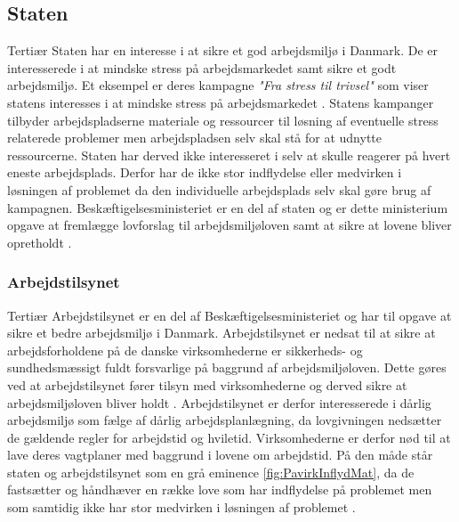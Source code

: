 \subsection{Staten} Tertiær
Staten har en interesse i at sikre et god arbejdsmiljø i Danmark. De er interesserede i at mindske stress på arbejdsmarkedet samt sikre et godt arbejdsmiljø. Et eksempel er deres kampagne \textit{"Fra stress til trivsel"} som viser statens interesses i at mindske stress på arbejdsmarkedet \citep{Arbejdsmiljoe_Arbejdspladser}. Statens kampanger tilbyder arbejdspladserne materiale og ressourcer til løsning af eventuelle stress relaterede problemer men arbejdspladsen selv skal stå for at udnytte ressourcerne. Staten har derved ikke interesseret i selv at skulle reagerer på hvert eneste arbejdsplads. Derfor har de ikke stor indflydelse eller medvirken i løsningen af problemet da den individuelle arbejdsplads selv skal gøre brug af kampagnen. Beskæftigelsesministeriet er en del af staten og er dette ministerium opgave at fremlægge lovforslag til arbejdsmiljøloven samt at sikre at lovene bliver opretholdt \citep{Beskaeftigelsesministeriet2002}.

\subsubsection{Arbejdstilsynet} Tertiær
Arbejdstilsynet er en del af Beskæftigelsesministeriet og har til opgave at sikre et bedre arbejdsmiljø i Danmark. Arbejdstilsynet er nedsat til at sikre at arbejdsforholdene på de danske virksomhederne er sikkerheds- og sundhedsmæssigt fuldt forsvarlige på baggrund af arbejdsmiljøloven. Dette gøres ved at arbejdstilsynet fører tilsyn med virksomhederne og derved sikre at arbejdsmiljøloven bliver holdt \citep{Arbejdstilsynet2015}. Arbejdstilsynet er derfor interesserede i dårlig arbejdsmiljø som fælge af dårlig arbejdsplanlægning, da lovgivningen nedsætter de gældende regler for arbejdstid og hviletid. Virksomhederne er derfor nød til at lave deres vagtplaner med baggrund i lovene om arbejdstid. På den måde står staten og arbejdstilsynet som en grå eminence \ref{fig:PavirkInflydMat}, da de fastsætter og håndhæver en række love som har indflydelse på problemet men som samtidig ikke har stor medvirken i løsningen af problemet \citep{Beskaeftigelsesministeriet2002}.

